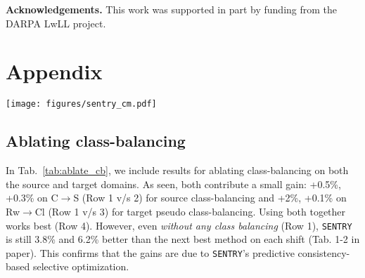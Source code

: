 \documentclass[10pt,twocolumn,letterpaper]{article}
\newcommand{\method}{\texttt{SENTRY}\xspace}
\begin{document}
\noindent\textbf{Acknowledgements.} This work was
supported in part by funding from the DARPA LwLL project. 

{\small


}

\section{Appendix}
\localtableofcontents

\newcommand\DoToC{\startcontents
  \printcontents{}{2}{\textbf{Contents}\vskip3pt\hrule\vskip5pt}
  \vskip3pt\hrule\vskip5pt
}

\begin{figure*}[b]
    \centering
    \texttt{[image: figures/sentry\_cm.pdf]}
    \caption{
    SVHN$\rightarrow$MNIST-LT (IF=20): Performance on target test set after \method.
    }
    \label{fig:sentry_cm}
 \end{figure*}

\subsection{Ablating class-balancing} 



 
 
In Tab.~\ref{tab:ablate_cb}, we include results for ablating class-balancing on both the source and target domains. As seen, both contribute a small gain: +0.5\%, +0.3\% on C$\to$S (Row 1 v/s 2) for source class-balancing and +2\%, +0.1\% on Rw$\to$Cl (Row 1 v/s 3) for target pseudo class-balancing. Using both together works best (Row 4). However, even \emph{without any class balancing} (Row 1), \method is still 3.8\% and 6.2\% better than the next best method on each shift (Tab. 1-2 in paper). This confirms that the gains are due to \method's predictive consistency-based selective optimization.
\end{document}
